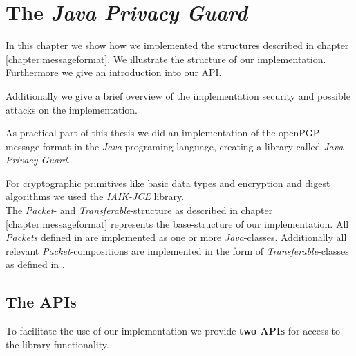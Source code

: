 \chapter{The \textit{Java Privacy Guard}} \label{chapter:jpg}


In this chapter we show how we implemented the structures described in chapter \ref{chapter:messageformat}. We illustrate the structure of our implementation. Furthermore we give an introduction into our API. 

Additionally we give a brief overview of the implementation security and possible attacks on the implementation. \\

As practical part of this thesis we did an implementation of the openPGP message format \citep{RFC4880} in the \textit{Java} programing language, creating a library called \textit{Java Privacy Guard}.

For cryptographic primitives like basic data types and encryption and digest algorithms we used the \textit{IAIK-JCE} library. \\






The \textit{Packet}- and \textit{Transferable}-structure as described in chapter \ref{chapter:messageformat} represents the base-structure of our implementation. All \textit{Packets} defined in \citep[section 5]{RFC4880} are implemented as one or more \textit{Java}-classes. Additionally all relevant \textit{Packet}-compositions are implemented in the form of \textit{Transferable}-classes as defined in \citep[section 11]{RFC4880}.

\section{The APIs}


To facilitate the use of our implementation we provide \textbf{two APIs} for access to the library functionality. \\  

